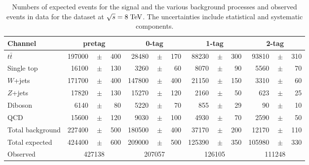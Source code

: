\begin{table}
  \begin{tabular}{ l  rrr  rrr  rrr  rrr }
    \toprule
    Channel & \multicolumn{3}{c}{\mujets{} pretag} & \multicolumn{3}{c}{\mujets{} 0-tag} & \multicolumn{3}{c}{\mujets{} 1-tag} & \multicolumn{3}{c}{\mujets{} 2-tag} \\
    \midrule      
    $t\bar{t}$       & 197000 &$\!\!\!\pm\!\!\!$& 400  & 28480 &$\!\!\!\pm\!\!\!$& 170  & 88230 &$\!\!\!\pm\!\!\!$& 300  & 93810 &$\!\!\!\pm\!\!\!$& 310  \\
    Single top       & 16100  &$\!\!\!\pm\!\!\!$& 130  & 3260  &$\!\!\!\pm\!\!\!$& 60  & 8070  &$\!\!\!\pm\!\!\!$& 90  & 5560  &$\!\!\!\pm\!\!\!$& 70   \\ 
    $W$+jets  & 171700 &$\!\!\!\pm\!\!\!$& 400 & 147800  &$\!\!\!\pm\!\!\!$& 400  & 21150 &$\!\!\!\pm\!\!\!$& 150  & 3310 &$\!\!\!\pm\!\!\!$& 60  \\
    $Z$+jets         & 17820  &$\!\!\!\pm\!\!\!$& 130  & 15270   &$\!\!\!\pm\!\!\!$& 120  & 2160  &$\!\!\!\pm\!\!\!$& 50  & 623   &$\!\!\!\pm\!\!\!$& 25   \\
    Diboson          & 6140   &$\!\!\!\pm\!\!\!$& 80   & 5220  &$\!\!\!\pm\!\!\!$& 70 & 855 &$\!\!\!\pm\!\!\!$& 29 & 90  &$\!\!\!\pm\!\!\!$& 10 \\ 
    QCD       & 15600  &$\!\!\!\pm\!\!\!$& 120  & 9030  &$\!\!\!\pm\!\!\!$& 100  & 4930  &$\!\!\!\pm\!\!\!$& 70  & 2590   &$\!\!\!\pm\!\!\!$& 50  \\ 
    \midrule
    Total background & 227400 &$\!\!\!\pm\!\!\!$& 500 & 180500  &$\!\!\!\pm\!\!\!$& 400  & 37170 &$\!\!\!\pm\!\!\!$& 200 & 12170  &$\!\!\!\pm\!\!\!$& 110  \\ 
    \midrule
    Total expected   & 424400 &$\!\!\!\pm\!\!\!$& 600 & 209000 &$\!\!\!\pm\!\!\!$& 500  & 125390 &$\!\!\!\pm\!\!\!$& 350 & 105980 &$\!\!\!\pm\!\!\!$& 330  \\ 
    \midrule
    Observed         & \multicolumn{3}{c}{427138}     & \multicolumn{3}{c}{207057}     & \multicolumn{3}{c}{126105}     & \multicolumn{3}{c}{111248}     \\ 
    \bottomrule
  \end{tabular}
  \caption[Event yields for the \mujets{} samples at $\sqrt{s} = 8 \TeV{}$]{
    Numbers of expected events for the \ttbar{} signal and the various background 
    processes and observed events in data for the \mujets{} dataset
    at $\sqrt{s} = 8 \TeV{}$.
    The uncertainties include statistical and systematic components.}
  \label{tab:yields2012mu}
\end{table}

